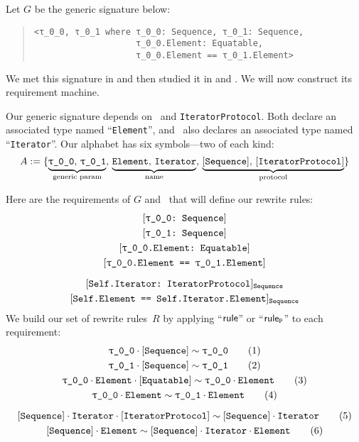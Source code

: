 \documentclass[../generics]{subfiles}
\begin{document}
\begin{example}\label{rqm first example}
Let $G$ be the generic signature below:
\begin{quote}
\begin{verbatim}
<τ_0_0, τ_0_1 where τ_0_0: Sequence, τ_0_1: Sequence,
                    τ_0_0.Element: Equatable,
                    τ_0_0.Element == τ_0_1.Element>
\end{verbatim}
\end{quote}
We met this signature in  and then studied it in  and . We will now construct its requirement machine.

Our generic signature depends on \tSequence\ and \texttt{IteratorProtocol}. Both declare an associated type named ``\texttt{Element}'', and \tSequence\ also declares an associated type named ``\texttt{Iterator}''. Our alphabet has six symbols---two of each kind:
\[ A := \{ \underbrace{\mathstrut\rT,\, \rU}_{\text{generic param}},\, \underbrace{\mathstrut\nElement,\, \nIterator}_{\text{name}},\, \underbrace{\mathstrut\pSequence,\, \pIterator}_{\text{protocol}} \} \]

Here are the requirements of $G$ and \tSequence\ that will define our rewrite rules:
\begin{gather*}
\ConfReq{\rT}{Sequence}\\
\ConfReq{\rU}{Sequence}\\
\ConfReq{\rT.Element}{Equatable}\\
\SameReq{\rT.Element}{\rU.Element}\\[\medskipamount]
\AssocConfReq{Self.Iterator}{IteratorProtocol}{Sequence}\\
\AssocSameReq{Self.Element}{Self.Iterator.Element}{Sequence}
\end{gather*}
We build our set of rewrite rules~$R$ by applying ``$\mathsf{rule}$'' or ``$\mathsf{rule}_{\texttt{P}}$'' to each requirement:
\begin{gather*}
\ConfRule{\rT}{\pSequence} \tag{1} \\
\ConfRule{\rU}{\pSequence} \tag{2} \\
\ConfRule{\rT\cdot\nElement}{\protosym{Equatable}} \tag{3} \\
\SameRule{\rT\cdot\nElement}{\rU\cdot\nElement}\tag{4} \\[\medskipamount]
\ConfRule{\pSequence\cdot\nIterator}{\pIterator} \tag{5} \\
\SameRule{\pSequence\cdot\nElement}{\pSequence\cdot\nIterator\cdot\nElement} \tag{6}
\end{gather*}


\end{example}
\end{document}
